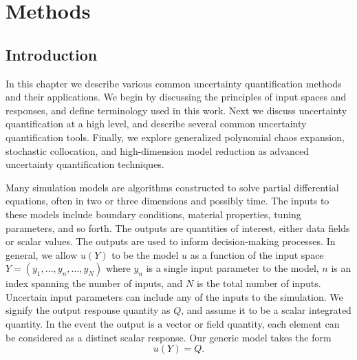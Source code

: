 
\chapter{Methods} %

\label{ch:methods} %



\section{Introduction}
In this chapter we describe various common uncertainty quantification methods and their applications. We begin
by discussing the principles of input spaces and responses, and define terminology used in this work.  Next we
discuss uncertainty quantification at a high level, and describe several common uncertainty quantification
tools.  Finally, we explore generalized polynomial chaos expansion, stochastic collocation, and high-dimension
model reduction as advanced uncertainty quantification techniques.

Many simulation models are algorithms constructed to solve partial differential equations, often in two or
three dimensions and possibly time.  The inputs to these models include boundary conditions, material
properties, tuning parameters, and so forth.  The outputs are quantities of interest, either data fields or
scalar values.  The outputs are used to inform decision-making processes.  In general, we allow $u(Y)$ to be
the model $u$ as a function of the input space $Y = (y_1,\ldots,y_n,\ldots,y_N)$ where $y_n$ is a single input
parameter to the model, $n$ is an index spanning the number of inputs, and $N$ is the total number of inputs.
Uncertain input parameters can include any of the inputs to the simulation.
We signify the output response quantity as $Q$, and assume it to be a scalar integrated quantity.  In the event
the output is a vector or field quantity, each element can be considered as a distinct scalar response.
Our generic model takes the form
\begin{equation}
  u(Y) = Q.
\end{equation}


